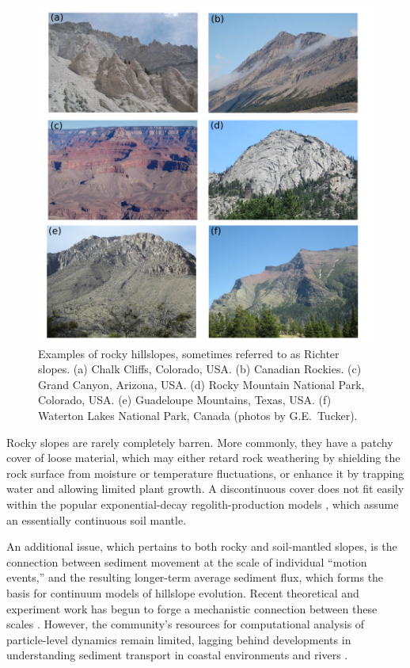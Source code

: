 \documentclass[esurf, manuscript]{copernicus}
\begin{document}
\begin{figure}[t]
\includegraphics{Figures/rock_slope_photos.pdf}
\caption{Examples of rocky hillslopes, sometimes referred to as Richter slopes. (a) Chalk Cliffs, Colorado, USA. (b) Canadian Rockies. (c) Grand Canyon, Arizona, USA. (d) Rocky Mountain National Park, Colorado, USA. (e) Guadeloupe Mountains, Texas, USA. (f) Waterton Lakes National Park, Canada (photos by G.E.\ Tucker).}
\label{rockslopes}
\end{figure}

Rocky slopes are rarely completely barren. More commonly, they have a patchy cover of loose material, which may either retard rock weathering by shielding the rock surface from moisture or temperature fluctuations, or enhance it by trapping water and allowing limited plant growth. A discontinuous cover does not fit easily within the popular exponential-decay regolith-production models \citep[e.g.,][]{heimsath2012soil,lamb2013sediment}, which assume an essentially continuous soil mantle.

An additional issue, which pertains to both rocky and soil-mantled slopes, is the connection between sediment movement at the scale of individual ``motion events,'' and the resulting longer-term average sediment flux, which forms the basis for continuum models of hillslope evolution. Recent theoretical and experiment work has begun to forge a mechanistic connection between these scales \citep{culling1963soil,culling1965theory,furbish2009statistical,furbish2010divots,tucker2010trouble,gabet2012particle,lamb2013sediment}. However, the community's resources for computational analysis of particle-level dynamics remain limited, lagging behind developments in %
understanding sediment transport in coastal environments \citep{drake2001discrete} and rivers \citep{mcewan2001discrete,macvicar2006two,furbish2013probabilistic,schmeeckle2014numerical}.
\end{document}
